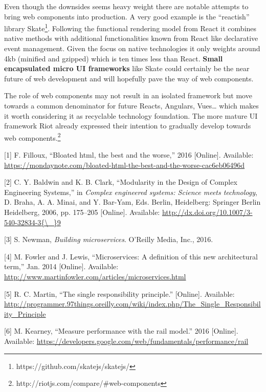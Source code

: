 \documentclass[]{article}
\begin{document}
Even though the downsides seems heavy weight there are notable attempts
to bring web components into production. A very good example is the
``reactish'' library Skate\footnote{https://github.com/skatejs/skatejs/}.
Following the functional rendering model from React it combines native
methods with additional functionalities known from React like
declarative event management. Given the focus on native technologies it
only weights around 4kb (minified and gzipped) which is ten times less
than React. \textbf{Small encapsulated micro UI frameworks} like Skate
could certainly be the near future of web development and will hopefully
pave the way of web components.

The role of web components may not result in an isolated framework but
move towards a common denominator for future Reacts, Angulars,
Vues\ldots{} which makes it worth considering it as recyclable
technology foundation. The more mature UI framework Riot already
expressed their intention to gradually develop towards web
components.\footnote{http://riotjs.com/compare/\#web-components}

\hypertarget{refs}{}
\hypertarget{ref-Filloux2016}{}
{[}1{]} F. Filloux, ``Bloated html, the best and the worse,'' 2016
{[}Online{]}. Available:
\url{https://mondaynote.com/bloated-html-the-best-and-the-worse-cac6eb06496d}

\hypertarget{ref-Baldwin2006}{}
{[}2{]} C. Y. Baldwin and K. B. Clark, ``Modularity in the Design of
Complex Engineering Systems,'' in \emph{Complex engineered systems:
Science meets technology}, D. Braha, A. A. Minai, and Y. Bar-Yam, Eds.
Berlin, Heidelberg: Springer Berlin Heidelberg, 2006, pp. 175--205
{[}Online{]}. Available:
\href{http://dx.doi.org/10.1007/3-540-32834-3\%7B/_\%7D9}{http://dx.doi.org/10.1007/3-540-32834-3\{\textbackslash{}\_\}9}

\hypertarget{ref-Newman2015}{}
{[}3{]} S. Newman, \emph{Building microservices}. O'Reilly Media, Inc.,
2016.

\hypertarget{ref-Fowler2014}{}
{[}4{]} M. Fowler and J. Lewis, ``Microservices: A definition of this
new architectural term,'' Jan. 2014 {[}Online{]}. Available:
\url{http://www.martinfowler.com/articles/microservices.html}

\hypertarget{ref-Martin}{}
{[}5{]} R. C. Martin, ``The single responsibility principle.''
{[}Online{]}. Available:
\url{http://programmer.97things.oreilly.com/wiki/index.php/The_Single_Responsibility_Principle}

\hypertarget{ref-Kearney2016}{}
{[}6{]} M. Kearney, ``Measure performance with the rail model.'' 2016
{[}Online{]}. Available:
\url{https://developers.google.com/web/fundamentals/performance/rail}
\end{document}
